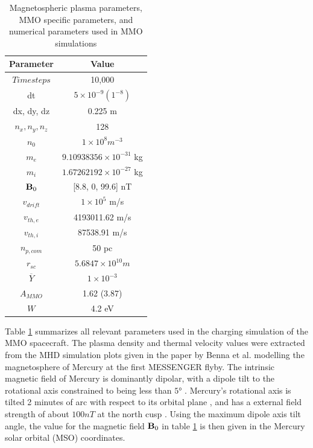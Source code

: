 \begin{table}[H]
    \centering
    \begin{tabular}{c|c}
        \toprule
        \toprule
        Parameter & Value \\
        \midrule
        $Timesteps$ & 10,000 \\
        dt & $5 \times 10^{-9} (1^{-8})$ \\
        dx, dy, dz & 0.225 m \\
        $n_x, n_y, n_z$ & 128 \\
        $n_0$ & $1 \times 10^8 m^{-3}$ \\
        $m_e$ & $9.10938356 \times 10^{-31}$ kg\\
        $m_i$ & $1.67262192 \times 10^{-27}$ kg\\
        $\vb{B}_0$ & [8.8, 0, 99.6] nT\\
        $v_{drift}$ & $1 \times 10^5$ m/s\\
        $v_{th,e}$ & 4193011.62 m/s\\
        $v_{th,i}$ & 87538.91 m/s\\
        $n_{p,com}$ & 50 pc\\
        $r_{sc}$ & $5.6847 \times 10^{10} m$\\
        $\overline{Y}$ & $ 1 \times 10^{-3}$ \\
        $A_{MMO}$ & 1.62 (3.87) \\
        $W$ & 4.2 eV \\
        \bottomrule
        \bottomrule
    \end{tabular}
    \caption{Magnetospheric plasma parameters, MMO specific parameters, and numerical parameters used in MMO simulations}
    \label{tab:PlasmaParamMMO}
\end{table}

Table \ref{tab:PlasmaParamMMO} summarizes all relevant parameters used in the charging simulation of the MMO spacecraft. The plasma density and thermal velocity values were extracted from the MHD simulation plots given in the paper by Benna et al. modelling the magnetosphere of Mercury at the first MESSENGER flyby. The intrinsic magnetic field of Mercury is dominantly dipolar, with a dipole tilt to the rotational axis constrained to being less than $\ang{5}$ . Mercury's rotational axis is tilted 2 minutes of arc with respect to its orbital plane \parencite{Rothery2015}, and has a external field strength of about $100 nT$ at the north cusp . Using the maximum dipole axis tilt angle, the value for the magnetic field $\vb{B}_0$ in table \ref{tab:PlasmaParamMMO} is then given in the Mercury solar orbital (MSO) coordinates. 

